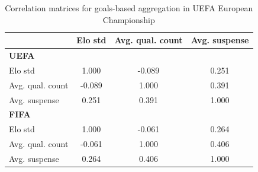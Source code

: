 \begin{table}[H]
\centering
\small
\caption{Correlation matrices for goals-based aggregation in UEFA European Championship}
\label{tab:corr_eu}
\begin{tabular}{lccc}
\toprule
 & Elo std & Avg. qual. count & Avg. suspense \\
\midrule
\multicolumn{4}{l}{\textbf{UEFA}} \\
Elo std             & 1.000 & -0.089 & 0.251 \\
Avg. qual. count    & -0.089 & 1.000 & 0.391 \\
Avg. suspense       & 0.251 & 0.391 & 1.000 \\
\midrule
\multicolumn{4}{l}{\textbf{FIFA}} \\
Elo std             & 1.000 & -0.061 & 0.264 \\
Avg. qual. count    & -0.061 & 1.000 & 0.406 \\
Avg. suspense       & 0.264 & 0.406 & 1.000 \\
\bottomrule
\end{tabular}
\end{table}
